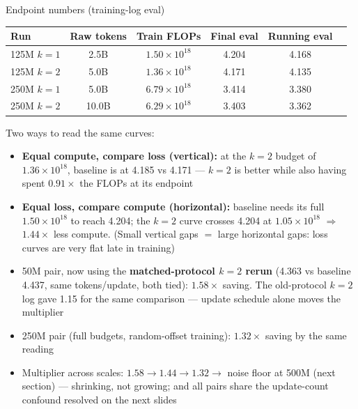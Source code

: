 \documentclass[10pt,aspectratio=169]{beamer}
\newcommand{\good}[1]{\textcolor{okgreen}{#1}}
\newcommand{\bad}[1]{\textcolor{warnred}{#1}}
\begin{document}
\begin{frame}{Endpoint numbers (training-log eval)}
  \footnotesize
  \centering
  \begin{tabular}{lccccc}
    \toprule
    Run & Raw tokens & Train FLOPs & Final eval & Running eval \\
    \midrule
    125M $k{=}1$ & 2.5B & $1.50\times10^{18}$ & 4.204 & 4.168 \\
    125M $k{=}2$ & 5.0B & $1.36\times10^{18}$ & \good{4.171} & \good{4.135} \\
    250M $k{=}1$ & 5.0B & $6.79\times10^{18}$ & 3.414 & 3.380 \\
    250M $k{=}2$ & 10.0B & $6.29\times10^{18}$ & \good{3.403} & \good{3.362} \\
    \bottomrule
  \end{tabular}

  \vspace{0.3em}
  Two ways to read the same curves:
  \begin{itemize}
    \item \textbf{Equal compute, compare loss (vertical):} at the $k{=}2$
          budget of $1.36\times10^{18}$, baseline is at 4.185 vs
          \good{4.171} --- $k{=}2$ is better while also having spent
          $0.91\times$ the FLOPs at its endpoint
    \item \textbf{Equal loss, compare compute (horizontal):} baseline needs its
          full $1.50\times10^{18}$ to reach 4.204; the $k{=}2$ curve crosses
          4.204 at $1.05\times10^{18}$ $\Rightarrow$
          \good{$\mathbf{1.44\times}$ less compute}.
          (Small vertical gaps $=$ large horizontal gaps: loss curves are very
          flat late in training)
    \item 50M pair, now using the \textbf{matched-protocol $k{=}2$ rerun}
          (4.363 vs baseline 4.437, same tokens/update, both tied):
          \good{$\mathbf{1.58\times}$} saving. The old-protocol $k{=}2$ log
          gave 1.15\texttimes{} for the same comparison --- update schedule
          alone moves the multiplier
    \item 250M pair (full budgets, random-offset training):
          \good{$\mathbf{1.32\times}$} saving by the same reading
    \item Multiplier across scales: $1.58 \to 1.44 \to 1.32 \to$
          \bad{noise floor at 500M} (next section) ---
          \bad{shrinking, not growing}; and all pairs share the
          update-count confound resolved on the next slides
  \end{itemize}
\end{frame}
\end{document}

